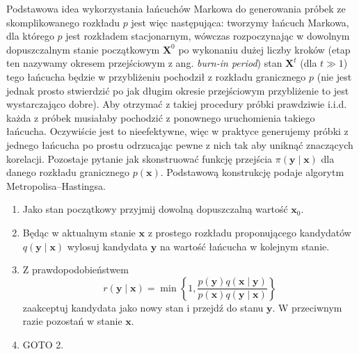 \documentclass{myclass}
\numberwithin{equation}{subsection}
\begin{document}
Podstawowa idea wykorzystania łańcuchów Markowa do generowania próbek ze skomplikowanego rozkładu
\(p\) jest więc następująca: tworzymy łańcuch Markowa, dla którego \(p\) jest rozkładem
stacjonarnym, wówczas rozpoczynając w dowolnym dopuszczalnym stanie początkowym \(\bm{X}^0\) po
wykonaniu dużej liczby kroków (etap ten nazywamy okresem przejściowym z ang. \textit{burn-in
period}) stan \(\bm{X}^t\) (dla \(t \gg 1\)) tego łańcucha będzie w przybliżeniu pochodził z
rozkładu granicznego \(p\) (nie jest jednak prosto stwierdzić po jak długim okresie przejściowym
przybliżenie to jest wystarczająco dobre). Aby otrzymać z takiej procedury próbki prawdziwie i.i.d.
każda z próbek musiałaby pochodzić z ponownego uruchomienia takiego łańcucha. Oczywiście jest to
nieefektywne, więc w praktyce generujemy próbki z jednego łańcucha po prostu odrzucając pewne z nich
tak aby uniknąć znaczących korelacji. Pozostaje pytanie jak skonstruować funkcję przejścia
\(\pi(\bm{y} \mid \bm{x})\) dla danego rozkładu granicznego \(p(\bm{x})\). Podstawową konstrukcję
podaje algorytm Metropolisa--Hastingsa.
\begin{tcolorbox}[title=Algorytm Metropolisa--Hastingsa, breakable, boxrule=0pt]
\begin{enumerate}
\item Jako stan początkowy przyjmij dowolną dopuszczalną wartość \(\bm{x}_0\).
\item Będąc w aktualnym stanie \(\bm{x}\) z prostego rozkładu proponującego kandydatów \(q(\bm{y}
    \mid \bm{x})\) wylosuj kandydata \(\bm{y}\) na wartość łańcucha w kolejnym stanie.
\item Z prawdopodobieństwem
    \begin{equation*}
        r(\bm{y} \mid \bm{x}) = \min\left\{1, \frac{p(\bm{y})q(\bm{x} \mid \bm{y})}{p(\bm{x})q(\bm{y} \mid \bm{x})}\right\}
    \end{equation*}
    zaakceptuj kandydata jako nowy stan i przejdź do stanu \(\bm{y}\). W przeciwnym razie pozostań w
    stanie \(\bm{x}\).
\item GOTO 2.
\end{enumerate}
\end{tcolorbox}
\end{document}
